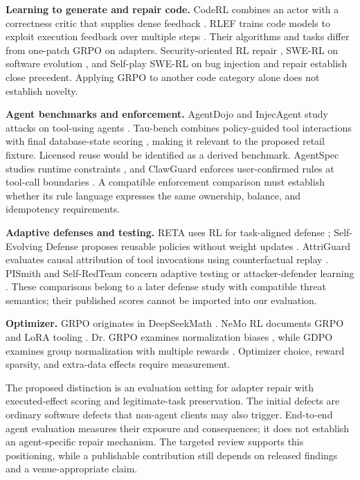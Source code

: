 \documentclass[11pt,a4paper]{article}
\begin{document}
\textbf{Learning to generate and repair code.} CodeRL combines an actor with a correctness critic that supplies dense feedback \cite{ref25}. RLEF trains code models to exploit execution feedback over multiple steps \cite{ref26}. Their algorithms and tasks differ from one-patch GRPO on adapters. Security-oriented RL repair \cite{ref4}, SWE-RL on software evolution \cite{ref5}, and Self-play SWE-RL on bug injection and repair \cite{ref6} establish close precedent. Applying GRPO to another code category alone does not establish novelty.

\textbf{Agent benchmarks and enforcement.} AgentDojo and InjecAgent study attacks on tool-using agents \cite{ref1,ref2}. Tau-bench combines policy-guided tool interactions with final database-state scoring \cite{ref20}, making it relevant to the proposed retail fixture. Licensed reuse would be identified as a derived benchmark. AgentSpec studies runtime constraints \cite{ref7}, and ClawGuard enforces user-confirmed rules at tool-call boundaries \cite{ref18}. A compatible enforcement comparison must establish whether its rule language expresses the same ownership, balance, and idempotency requirements.

\textbf{Adaptive defenses and testing.} RETA uses RL for task-aligned defense \cite{ref8}; Self-Evolving Defense proposes reusable policies without weight updates \cite{ref9}. AttriGuard evaluates causal attribution of tool invocations using counterfactual replay \cite{ref19}. PISmith and Self-RedTeam concern adaptive testing or attacker-defender learning \cite{ref10,ref11}. These comparisons belong to a later defense study with compatible threat semantics; their published scores cannot be imported into our evaluation.

\textbf{Optimizer.} GRPO originates in DeepSeekMath \cite{ref12}. NeMo RL documents GRPO and LoRA tooling \cite{ref13,ref14}. Dr. GRPO examines normalization biases \cite{ref16}, while GDPO examines group normalization with multiple rewards \cite{ref17}. Optimizer choice, reward sparsity, and extra-data effects require measurement.

The proposed distinction is an evaluation setting for adapter repair with executed-effect scoring and legitimate-task preservation. The initial defects are ordinary software defects that non-agent clients may also trigger. End-to-end agent evaluation measures their exposure and consequences; it does not establish an agent-specific repair mechanism. The targeted review supports this positioning, while a publishable contribution still depends on released findings and a venue-appropriate claim.
\end{document}

